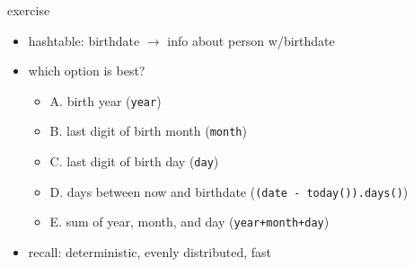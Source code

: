 \begin{frame}[fragile,label=activity]{exercise}
    \lstset{language=C++}
    \begin{itemize}
    \item hashtable: birthdate $\rightarrow$ info about person w/birthdate
    \item which option is best?
    \begin{itemize}
    \item A. birth year (\lstinline|year|)
    \item B. last digit of birth month (\lstinline|month|)
    \item C. last digit of birth day (\lstinline|day|)
    \item D. days between now and birthdate (\lstinline|(date - today()).days()|)
    \item E. sum of year, month, and day (\lstinline|year+month+day|)
    \end{itemize}
    \item recall: deterministic, evenly distributed, fast
    \end{itemize}
\end{frame}
